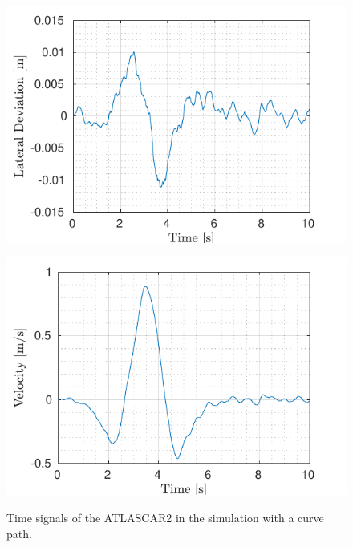 \begin{figure}[!h]
\begin{minipage}[t]{0.49\textwidth}
		\includegraphics[width=\textwidth]{../../MATLAB/lane_following_curve/figure/LateralDeviationVsTime_curve.pdf}
		\label{fig:lateral_deviation_laneFollowing_curve}
	\end{minipage}
	\begin{minipage}[t]{0.49\textwidth}
		\includegraphics[width=\textwidth]{../../MATLAB/lane_following_curve/figure/LateralVelocityVsTime_curve.pdf}
		\label{fig:lateral_velocity_laneFollowing_curve}
	\end{minipage}
	\caption{Time signals of the ATLASCAR2 in the simulation with a curve path.}
	\label{fig:laneFollowing_signals_curve}
\end{figure}






